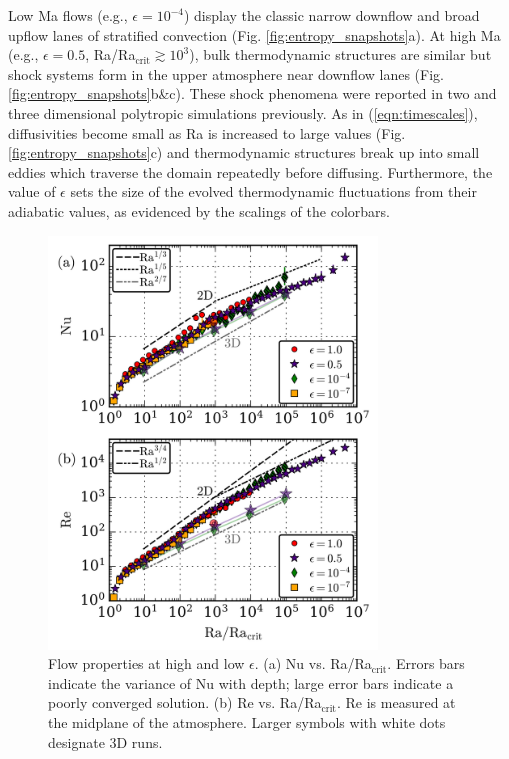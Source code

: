 \documentclass[aps, prl, twocolumn, nofootinbib, groupedaddress, amsfonts, amssymb, amsmath]{revtex4-1}
\begin{document}
Low Ma flows (e.g., $\epsilon = 10^{-4}$)
display the classic narrow downflow and broad upflow lanes of stratified
convection (Fig. \ref{fig:entropy_snapshots}a).
At high Ma (e.g., $\epsilon = 0.5$, Ra/Ra$_{\text{crit}} \gtrsim 10^3$), 
bulk thermodynamic structures are similar but
shock systems form in the upper atmosphere near downflow lanes 
(Fig. \ref{fig:entropy_snapshots}b\&c).
These shock phenomena were reported in
two \cite{cattaneo&all1990} and 
three \cite{malagoli&all1990} dimensional polytropic simulations previously.
As in (\ref{eqn:timescales}), diffusivities become small as Ra 
is increased to large values (Fig. \ref{fig:entropy_snapshots}c) and
thermodynamic structures break up into small eddies which traverse the
domain repeatedly before diffusing.
Furthermore, the value of $\epsilon$ sets the size of the
evolved thermodynamic fluctuations from their adiabatic values,
as evidenced by the scalings of the colorbars.



\begin{figure}[t]
\includegraphics[width=3.4375in]{./figs/re_and_nu_v_Ra.png}
\caption{
Flow properties at high and low $\epsilon$. 
(a) Nu vs. Ra/Ra$_{\text{crit}}$.
Errors bars indicate the variance of Nu with depth;
large error bars indicate a poorly converged solution.
(b) Re vs. Ra/Ra$_{\text{crit}}$.
Re is measured at the midplane of the atmosphere.
Larger symbols with white dots designate 3D runs.
 \label{fig:re_and_nu_v_ra}
}
\end{figure}
\end{document}

